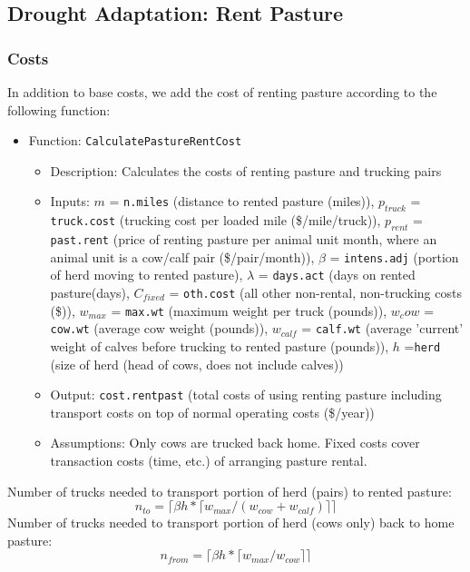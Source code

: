 \documentclass[11pt]{article}
\begin{document}
\subsection{Drought Adaptation: Rent Pasture}
\subsubsection{Costs}
In addition to base costs, we add the cost of renting pasture according to the following function:
\begin{itemize}
\item Function: \verb!CalculatePastureRentCost!
	\begin{itemize}
	\item Description: Calculates the costs of renting pasture and trucking pairs
	\item Inputs: $m$ = \verb!n.miles! (distance to rented pasture (miles)), $p_{truck}$ = \verb!truck.cost! (trucking cost per loaded mile (\$/mile/truck)), $p_{rent}$ = \verb!past.rent! (price of renting pasture per animal unit month, where an animal unit is a cow/calf pair (\$/pair/month)), $\beta$ = \verb!intens.adj! (portion of herd moving to rented pasture), $\lambda$ = \verb!days.act! (days on rented pasture(days), $C_{fixed}$ = \verb!oth.cost! (all other non-rental, non-trucking costs (\$)), $w_{max}$ = \verb!max.wt! (maximum weight per truck (pounds)), $w_cow$ = \verb!cow.wt! (average cow weight (pounds)), $w_{calf}$ = \verb!calf.wt! (average 'current' weight of calves before trucking to rented pasture (pounds)), $h$ =\verb!herd! (size of herd (head of cows, does not include calves))
	\item Output: \verb!cost.rentpast! (total costs of using renting pasture including transport costs on top of normal operating costs (\$/year))
	\item Assumptions: Only cows are trucked back home. Fixed costs cover transaction costs (time, etc.) of arranging pasture rental.
	\end{itemize}
\end{itemize}

Number of trucks needed to transport portion of herd (pairs) to rented pasture:
\begin{equation}
n_{to} = \lceil \beta h * \lceil w_{max} / (w_{cow} + w_{calf}) \rceil \rceil
\end{equation}
Number of trucks needed to transport portion of herd (cows only) back to home pasture:
\begin{equation}
n_{from} = \lceil \beta h * \lceil w_{max} / w_{cow} \rceil \rceil
\end{equation}
\end{document}
